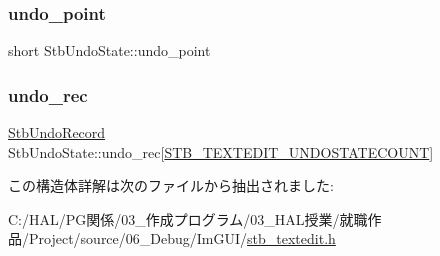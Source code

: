 \subsubsection{\texorpdfstring{undo\+\_\+point}{undo\_point}}
{\footnotesize\ttfamily short Stb\+Undo\+State\+::undo\+\_\+point}

\mbox{\label{struct_stb_undo_state_a8cb07be8f304d1620b50bd024709023f}} 
\subsubsection{\texorpdfstring{undo\+\_\+rec}{undo\_rec}}
{\footnotesize\ttfamily \mbox{\hyperlink{struct_stb_undo_record}{Stb\+Undo\+Record}} Stb\+Undo\+State\+::undo\+\_\+rec\mbox{[}\mbox{\hyperlink{stb__textedit_8h_afa79483143df87a1497010712b3dfaf9}{S\+T\+B\+\_\+\+T\+E\+X\+T\+E\+D\+I\+T\+\_\+\+U\+N\+D\+O\+S\+T\+A\+T\+E\+C\+O\+U\+NT}}\mbox{]}}



この構造体詳解は次のファイルから抽出されました\+:\begin{DoxyCompactItemize}
\item 
C\+:/\+H\+A\+L/\+P\+G関係/03\+\_\+作成プログラム/03\+\_\+\+H\+A\+L授業/就職作品/\+Project/source/06\+\_\+\+Debug/\+Im\+G\+U\+I/\mbox{\hyperlink{stb__textedit_8h}{stb\+\_\+textedit.\+h}}\end{DoxyCompactItemize}
